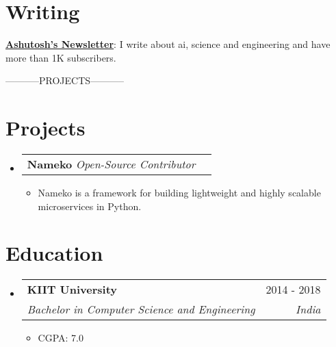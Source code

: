 \documentclass[letterpaper,11pt]{article}
\makeatletter
\newcommand{\resumeItem}[1]{
  \item\small{
    {#1 \vspace{1pt}}
  }
}
\newcommand{\resumeSubheading}[4]{
  \vspace{-2pt}\item
    \begin{tabular*}{0.97\textwidth}[t]{l@{\extracolsep{\fill}}r}
      \textbf{#1} & #2 \\
      \textit{\small#3} & \textit{\small #4} \\
    \end{tabular*}\vspace{-7pt}
}
\newcommand{\resumeProjectHeading}[2]{
    \item
    \begin{tabular*}{0.97\textwidth}{l@{\extracolsep{\fill}}r}
      \small#1 & #2 \\
    \end{tabular*}\vspace{-7pt}
}
\newcommand{\resumeSubHeadingListStart}{\begin{itemize}[leftmargin=0.15in, label={}]}
\newcommand{\resumeSubHeadingListEnd}{\end{itemize}}
\newcommand{\resumeItemListStart}{\begin{itemize}}
\newcommand{\resumeItemListEnd}{\end{itemize}\vspace{-5pt}}
\makeatother
\begin{document}
\section{Writing}
 \begin{itemize}[leftmargin=0.15in, label={}]
    \small{\item{
     \textbf{{\href{https://ashutoshnarang.substack.com}{Ashutosh's Newsletter}}}{: I write about ai, science and engineering and have more than 1K subscribers.}
    }}
 \end{itemize}


-----------PROJECTS-----------
\section{Projects}

    \resumeSubHeadingListStart
      \resumeProjectHeading
          {\textbf{Nameko} \emph{Open-Source Contributor}}{}
          \resumeItemListStart
            \resumeItem{Nameko is a framework for building lightweight and highly scalable microservices in Python.}
          \resumeItemListEnd

    \resumeSubHeadingListEnd

\section{Education}
  \resumeSubHeadingListStart
    \resumeSubheading
      {KIIT University}{2014 - 2018}
      {Bachelor in Computer Science and Engineering}{India}
          \resumeItemListStart
            \resumeItem{CGPA: 7.0}
        \resumeItemListEnd

  \resumeSubHeadingListEnd

\end{document}
